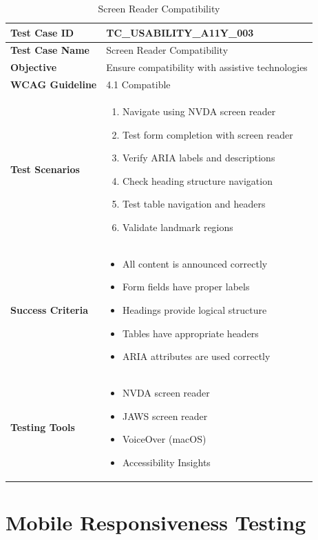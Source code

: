 \documentclass[12pt,a4paper]{article}
\begin{document}
\begin{longtable}{|p{3cm}|p{12cm}|}
\caption{Screen Reader Compatibility} \\
\hline
\rowcolor{lightgray}
\textbf{Test Case ID} & \textbf{TC\_USABILITY\_A11Y\_003} \\
\hline
\textbf{Test Case Name} & Screen Reader Compatibility \\
\hline
\textbf{Objective} & Ensure compatibility with assistive technologies \\
\hline
\textbf{WCAG Guideline} & 4.1 Compatible \\
\hline
\textbf{Test Scenarios} & 
\begin{enumerate}[nosep]
    \item Navigate using NVDA screen reader
    \item Test form completion with screen reader
    \item Verify ARIA labels and descriptions
    \item Check heading structure navigation
    \item Test table navigation and headers
    \item Validate landmark regions
\end{enumerate} \\
\hline
\textbf{Success Criteria} & 
\begin{itemize}[nosep]
    \item All content is announced correctly
    \item Form fields have proper labels
    \item Headings provide logical structure
    \item Tables have appropriate headers
    \item ARIA attributes are used correctly
\end{itemize} \\
\hline
\textbf{Testing Tools} & 
\begin{itemize}[nosep]
    \item NVDA screen reader
    \item JAWS screen reader
    \item VoiceOver (macOS)
    \item Accessibility Insights
\end{itemize} \\
\hline
\end{longtable}

\section{Mobile Responsiveness Testing}
\end{document}

